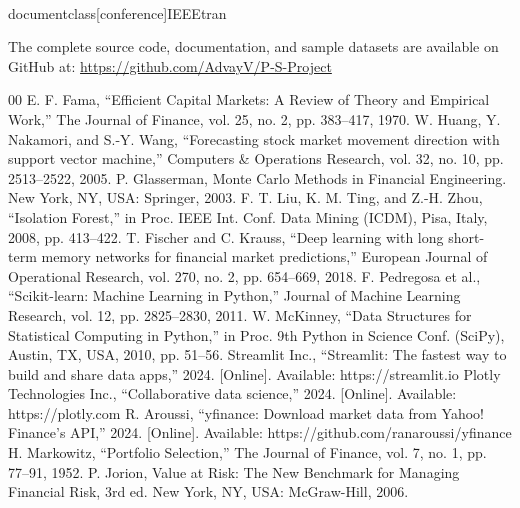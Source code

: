 \\documentclass[conference]{IEEEtran}
\begin{document}
The complete source code, documentation, and sample datasets are available on GitHub at: \url{https://github.com/AdvayV/P-S-Project}

\begin{thebibliography}{00}
 E. F. Fama, ``Efficient Capital Markets: A Review of Theory and Empirical Work,'' The Journal of Finance, vol. 25, no. 2, pp. 383--417, 1970.
 W. Huang, Y. Nakamori, and S.-Y. Wang, ``Forecasting stock market movement direction with support vector machine,'' Computers \& Operations Research, vol. 32, no. 10, pp. 2513--2522, 2005.
 P. Glasserman, Monte Carlo Methods in Financial Engineering. New York, NY, USA: Springer, 2003.
 F. T. Liu, K. M. Ting, and Z.-H. Zhou, ``Isolation Forest,'' in Proc. IEEE Int. Conf. Data Mining (ICDM), Pisa, Italy, 2008, pp. 413--422.
 T. Fischer and C. Krauss, ``Deep learning with long short-term memory networks for financial market predictions,'' European Journal of Operational Research, vol. 270, no. 2, pp. 654--669, 2018.
 F. Pedregosa et al., ``Scikit-learn: Machine Learning in Python,'' Journal of Machine Learning Research, vol. 12, pp. 2825--2830, 2011.
 W. McKinney, ``Data Structures for Statistical Computing in Python,'' in Proc. 9th Python in Science Conf. (SciPy), Austin, TX, USA, 2010, pp. 51--56.
 Streamlit Inc., ``Streamlit: The fastest way to build and share data apps,'' 2024. [Online]. Available: https://streamlit.io
 Plotly Technologies Inc., ``Collaborative data science,'' 2024. [Online]. Available: https://plotly.com
 R. Aroussi, ``yfinance: Download market data from Yahoo! Finance's API,'' 2024. [Online]. Available: https://github.com/ranaroussi/yfinance
 H. Markowitz, ``Portfolio Selection,'' The Journal of Finance, vol. 7, no. 1, pp. 77--91, 1952.
 P. Jorion, Value at Risk: The New Benchmark for Managing Financial Risk, 3rd ed. New York, NY, USA: McGraw-Hill, 2006.
\end{thebibliography}
\end{document}
